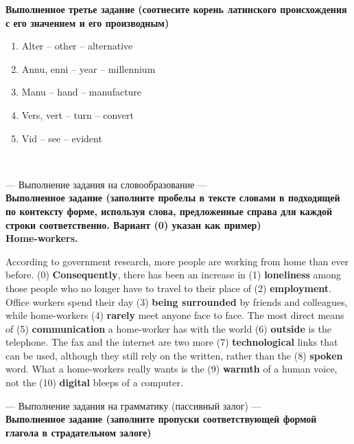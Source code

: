 \documentclass[main.tex]{subfiles}
\begin{document}
\textbf{Выполненное третье задание (соотнесите корень латинского происхождения с его значением и его производным)}

\begin{enumerate}[nosep]
	\item Alter -- other -- alternative
	\item Annu, enni -- year -- millennium
	\item Manu -- hand -- manufacture
	\item Vers, vert -- turn -- convert
	\item Vid -- see -- evident
\end{enumerate}
\ 

\newpage
{}

--- Выполнение задания на словообразование ---
\\

\textbf{Выполненное задание (заполните пробелы в тексте словами в подходящей по контексту форме, используя слова, предложенные справа для каждой строки соответственно. Вариант (0) указан как пример)}
\\

\textbf{Home-workers.}

According to government research, more people are working from home than ever before.
(0) \textbf{Consequently}, there has been an increase in (1) \textbf{loneliness} among those people who no longer have to travel to their place of (2) \textbf{employment}.
Office workers spend their day (3) \textbf{being surrounded} by friends and colleagues, while home-workers (4) \textbf{rarely} meet anyone face to face.
The most direct means of (5) \textbf{communication} a home-worker has with the world (6) \textbf{outside} is the telephone.
The fax and the internet are two more (7) \textbf{technological} links that can be used, although they still rely on the written, rather than the (8) \textbf{spoken} word.
What a home-workers really wants is the (9) \textbf{warmth} of a human voice, not the (10) \textbf{digital} bleeps of a computer.
\\

\newpage
{}

--- Выполнение задания на грамматику (пассивный залог) ---
\\

\textbf{Выполненное задание (заполните пропуски соответствующей формой глагола в страдательном залоге)}
\end{document}
